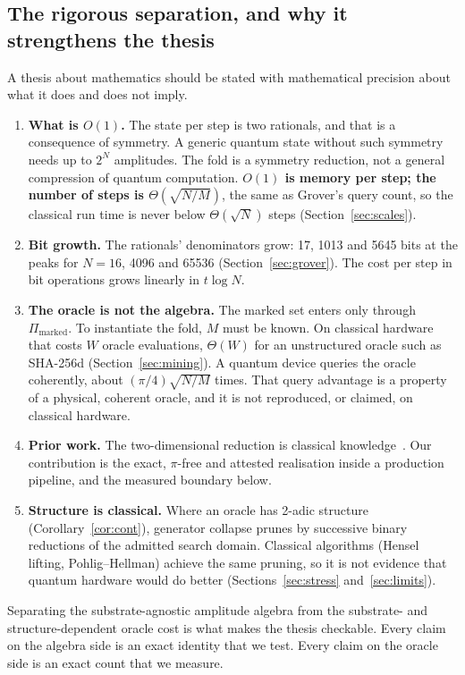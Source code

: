 \documentclass[11pt]{article}
\theoremstyle{definition}
\begin{document}
\subsection{The rigorous separation, and why it strengthens the thesis}\label{sec:sep}
A thesis about mathematics should be stated with mathematical precision about what it does and does not imply.
\begin{enumerate}
\item \textbf{What is $O(1)$.} The state per step is two rationals, and that is a consequence of symmetry. A generic
quantum state without such symmetry needs up to $2^N$ amplitudes. The fold is a symmetry reduction, not a general
compression of quantum computation. \textbf{$O(1)$ is memory per step; the number of steps is
$\Theta(\sqrt{N/M})$}, the same as Grover's query count, so the classical run time is never below $\Theta(\sqrt N)$
steps (Section~\ref{sec:scales}).
\item \textbf{Bit growth.} The rationals' denominators grow: 17, 1013 and 5645 bits at the peaks for $N=16$, 4096
and 65536 (Section~\ref{sec:grover}). The cost per step in bit operations grows linearly in $t\log N$.
\item \textbf{The oracle is not the algebra.} The marked set enters only through $\Pi_{\mathrm{marked}}$. To
instantiate the fold, $M$ must be known. On classical hardware that costs $W$ oracle evaluations, $\Theta(W)$ for an
unstructured oracle such as SHA-256d (Section~\ref{sec:mining}). A quantum device queries the oracle coherently,
about $(\pi/4)\sqrt{N/M}$ times. That query advantage is a property of a physical, coherent oracle, and it is not
reproduced, or claimed, on classical hardware.
\item \textbf{Prior work.} The two-dimensional reduction is classical knowledge~\cite{grover,bbht,nc}. Our
contribution is the exact, $\pi$-free and attested realisation inside a production pipeline, and the measured
boundary below.
\item \textbf{Structure is classical.} Where an oracle has 2-adic structure (Corollary~\ref{cor:cont}), generator
collapse prunes by successive binary reductions of the admitted search domain. Classical algorithms (Hensel lifting, Pohlig--Hellman) achieve the same pruning, so it
is not evidence that quantum hardware would do better (Sections~\ref{sec:stress} and~\ref{sec:limits}).
\end{enumerate}
Separating the substrate-agnostic amplitude algebra from the substrate- and structure-dependent oracle cost is what
makes the thesis checkable. Every claim on the algebra side is an exact identity that we test. Every claim on the
oracle side is an exact count that we measure.
\end{document}
